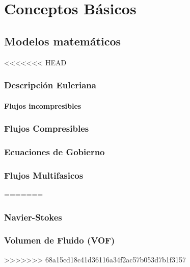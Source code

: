 \chapter{Conceptos Básicos} %

\section{Modelos matemáticos}
<<<<<<< HEAD
	\subsection{Descripción Euleriana}
		\subsubsection{Flujos incompresibles}
	\subsection{Flujos Compresibles}%
	\subsection{Ecuaciones de Gobierno}
	\subsection{Flujos Multifasicos}%
=======
	\subsection{Navier-Stokes}
	\subsection{Volumen de Fluido (VOF)} %
>>>>>>> 68a15cd18c41d36116a34f2ac57b053d7b1f3157
	
